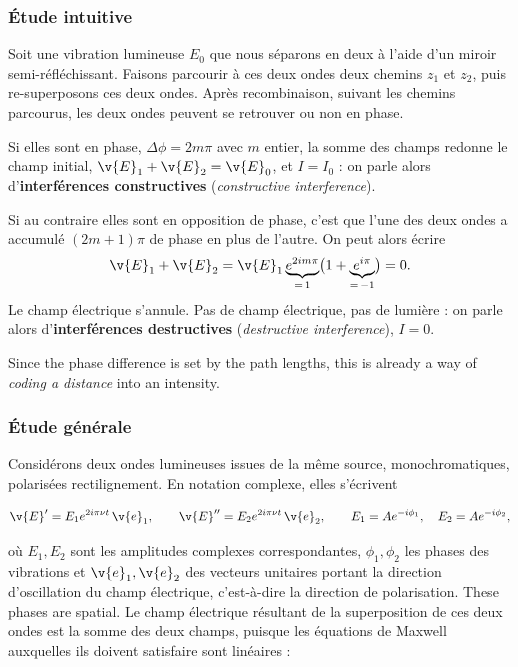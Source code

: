 \subsubsection{Étude intuitive}

Soit une vibration lumineuse $E_0$ que nous séparons en deux à l'aide d'un
miroir semi-réfléchissant. Faisons parcourir à ces deux ondes deux chemins $z_1$
et $z_2$, puis re-superposons ces deux ondes. Après recombinaison, suivant les
chemins parcourus, les deux ondes peuvent se retrouver ou non en phase.

\begin{subpart}
  \item Si elles sont en phase, $\Delta\phi = 2m\pi$ avec $m$ entier, la somme
    des champs redonne le champ initial, $\v{E}_1 + \v{E}_2 = \v{E}_0$, et
    $I = I_0$ : on parle alors d'\textbf{interférences constructives}
    (\textit{constructive interference}).
  \item Si au contraire elles sont en opposition de phase, c'est que l'une des
    deux ondes a accumulé $(2m+1)\pi$ de phase en plus de l'autre. On peut alors
    écrire
    \[ \v{E}_1 + \v{E}_2
       = \v{E}_1 \underbrace{e^{2im\pi}}_{=\,1}
         \bigl(1 + \underbrace{e^{i\pi}}_{=\,-1}\bigr) = 0 . \]
    Le champ électrique s'annule. Pas de champ électrique, pas de lumière : on
    parle alors d'\textbf{interférences destructives}
    (\textit{destructive interference}), $I = 0$.
\end{subpart}

Since the phase difference is set by the path lengths, this is already a way of
\emph{coding a distance} into an intensity.

\subsubsection{Étude générale}

Considérons deux ondes lumineuses issues de la même source, monochromatiques,
polarisées rectilignement. En notation complexe, elles s'écrivent

\[ \v{E}' = E_1 e^{2i\pi\nu t}\, \v{e}_1, \qquad
   \v{E}'' = E_2 e^{2i\pi\nu t}\, \v{e}_2, \qquad
   E_1 = A e^{-i\phi_1}, \quad E_2 = A e^{-i\phi_2}, \]

où $E_1, E_2$ sont les amplitudes complexes correspondantes, $\phi_1, \phi_2$ les
phases des vibrations et $\v{e}_1, \v{e}_2$ des vecteurs unitaires portant la
direction d'oscillation du champ électrique, c'est-à-dire la direction de
polarisation. These phases are spatial. Le champ électrique résultant de la
superposition de ces deux ondes est la somme des deux champs, puisque les
équations de Maxwell auxquelles ils doivent satisfaire sont linéaires :

